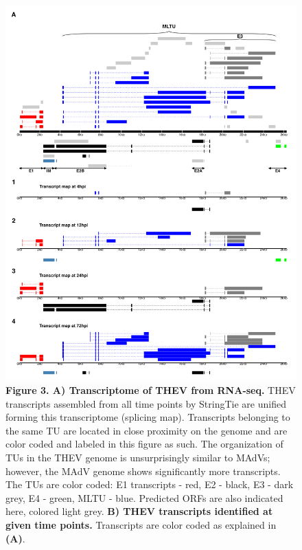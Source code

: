\documentclass[
]{article}
\begin{document}
\begin{figure}
\centering
\includegraphics{results/r/figures/figure3.png}
\caption{\textbf{Figure 3. A) Transcriptome of THEV from RNA-seq.} THEV
transcripts assembled from all time points by StringTie are unified
forming this transcriptome (splicing map). Transcripts belonging to the
same TU are located in close proximity on the genome and are color coded
and labeled in this figure as such. The organization of TUs in the THEV
genome is unsurprisingly similar to MAdVs; however, the MAdV genome
shows significantly more transcripts. The TUs are color coded: E1
transcripts - red, E2 - black, E3 - dark grey, E4 - green, MLTU - blue.
Predicted ORFs are also indicated here, colored light grey. \textbf{B)
THEV transcripts identified at given time points.} Transcripts are color
coded as explained in \textbf{(A)}.}
\end{figure}
\end{document}
